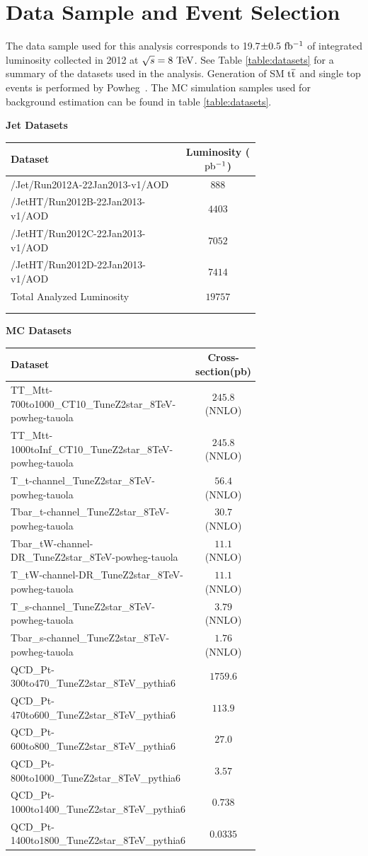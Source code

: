 \chapter{Data Sample and Event Selection}
\label{sec:datasampleAndSelection}
The data sample used for this analysis corresponds to 19.7$\pm0.5~\mathrm{fb^{-1}}$ of integrated 
luminosity collected in 2012 at $\sqrt{s} = 8~\mathrm{TeV}$.  See Table \ref{table:datasets} for a summary of the datasets used in the analysis.
Generation of SM $\mathrm{t\overline{t}}$ and single top events is performed by Powheg~\cite{Oleari:2010nx}.  
The MC simulation samples used for background estimation can be found in table \ref{table:datasets}.

\begin{table}
\begin{center}
\bf{Jet Datasets}
\begin{tabular}{p{0.7\linewidth}|c}
\hline\hline
\bf{Dataset} & \bf{Luminosity ($\mathrm{pb^{-1}}$)} \\
\hline\hline
/Jet/Run2012A-22Jan2013-v1/AOD & $888$ \\
/JetHT/Run2012B-22Jan2013-v1/AOD & $4403$ \\
/JetHT/Run2012C-22Jan2013-v1/AOD & $7052$ \\
/JetHT/Run2012D-22Jan2013-v1/AOD & $7414$ \\
Total Analyzed Luminosity & $19757$ \\
\hline 
\\
\\
\end{tabular}
\bf{MC Datasets} \\
\begin{tabular}{p{0.7\linewidth}|c}
\hline\hline
\bf{Dataset} & \bf{Cross-section(pb)} \\
\hline\hline
TT\_Mtt-700to1000\_CT10\_TuneZ2star\_8TeV-powheg-tauola & $245.8$ (NNLO)\\
TT\_Mtt-1000toInf\_CT10\_TuneZ2star\_8TeV-powheg-tauola & $245.8$ (NNLO)\\
T\_t-channel\_TuneZ2star\_8TeV-powheg-tauola & $56.4$ (NNLO)\\
Tbar\_t-channel\_TuneZ2star\_8TeV-powheg-tauola & $30.7$ (NNLO)\\
Tbar\_tW-channel-DR\_TuneZ2star\_8TeV-powheg-tauola & $11.1$ (NNLO)\\
T\_tW-channel-DR\_TuneZ2star\_8TeV-powheg-tauola & $11.1$ (NNLO)\\
T\_s-channel\_TuneZ2star\_8TeV-powheg-tauola & $3.79$ (NNLO)\\
Tbar\_s-channel\_TuneZ2star\_8TeV-powheg-tauola & $1.76$ (NNLO)\\
QCD\_Pt-300to470\_TuneZ2star\_8TeV\_pythia6 & $1759.6$ \\
QCD\_Pt-470to600\_TuneZ2star\_8TeV\_pythia6 & $113.9$ \\
QCD\_Pt-600to800\_TuneZ2star\_8TeV\_pythia6 & $27.0$ \\
QCD\_Pt-800to1000\_TuneZ2star\_8TeV\_pythia6 & $3.57$ \\
QCD\_Pt-1000to1400\_TuneZ2star\_8TeV\_pythia6 & $0.738$ \\
QCD\_Pt-1400to1800\_TuneZ2star\_8TeV\_pythia6 & $0.0335$ \\
\hline


\end{tabular}
\end{center}
\end{table}
